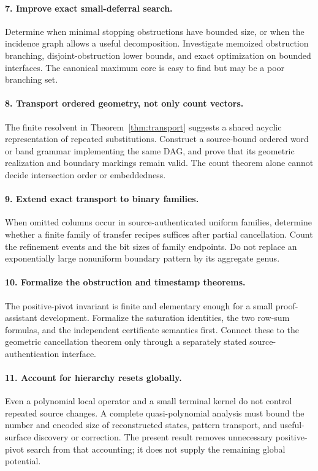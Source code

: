 \documentclass[11pt]{article}
\theoremstyle{definition}\newtheorem{definition}[theorem]{Definition}
\theoremstyle{remark}\newtheorem{remark}[theorem]{Remark}
\begin{document}
\paragraph{7. Improve exact small-deferral search.}
Determine when minimal stopping obstructions have bounded size, or when the incidence graph allows a useful decomposition. Investigate memoized obstruction branching, disjoint-obstruction lower bounds, and exact optimization on bounded interfaces. The canonical maximum core is easy to find but may be a poor branching set.

\paragraph{8. Transport ordered geometry, not only count vectors.}
The finite resolvent in Theorem~\ref{thm:transport} suggests a shared acyclic representation of repeated substitutions. Construct a source-bound ordered word or band grammar implementing the same DAG, and prove that its geometric realization and boundary markings remain valid. The count theorem alone cannot decide intersection order or embeddedness.

\paragraph{9. Extend exact transport to binary families.}
When omitted columns occur in source-authenticated uniform families, determine whether a finite family of transfer recipes suffices after partial cancellation. Count the refinement events and the bit sizes of family endpoints. Do not replace an exponentially large nonuniform boundary pattern by its aggregate genus.

\paragraph{10. Formalize the obstruction and timestamp theorems.}
The positive-pivot invariant is finite and elementary enough for a small proof-assistant development. Formalize the saturation identities, the two row-sum formulas, and the independent certificate semantics first. Connect these to the geometric cancellation theorem only through a separately stated source-authentication interface.

\paragraph{11. Account for hierarchy resets globally.}
Even a polynomial local operator and a small terminal kernel do not control repeated source changes. A complete quasi-polynomial analysis must bound the number and encoded size of reconstructed states, pattern transport, and useful-surface discovery or correction. The present result removes unnecessary positive-pivot search from that accounting; it does not supply the remaining global potential.
\end{document}
